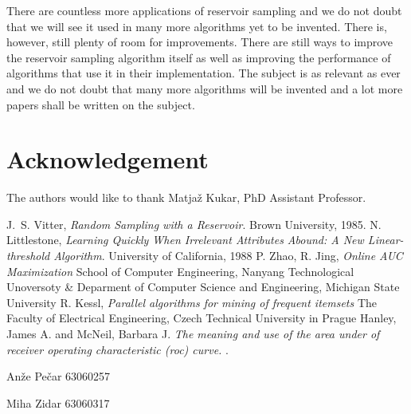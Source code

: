 \documentclass[journal]{IEEEtran/IEEEtran}
\begin{document}
There are countless more applications of reservoir sampling and we do not doubt that we will see it used in many more algorithms yet to be invented. There is, however, still plenty of room for improvements. There are still ways to improve the reservoir sampling algorithm itself as well as improving the performance of algorithms that use it in their implementation. The subject is as relevant as ever and we do not doubt that many more algorithms will be invented and a lot more papers shall be written on the subject. 
\appendices

\section*{Acknowledgement}
The authors would like to thank Matjaž Kukar, PhD Assistant Professor.


\begin{thebibliography}{1}
J.~S. Vitter, \emph{Random Sampling with a Reservoir}. \relax Brown University, 1985.
N. Littlestone, \emph{Learning Quickly When Irrelevant Attributes
Abound: A New Linear-threshold Algorithm}. \relax University of California, 1988
P. Zhao, R. Jing, \emph{Online AUC Maximization} \relax School of Computer Engineering, Nanyang Technological Unoversoty \& Deparment of Computer Science and Engineering, Michigan State University
R. Kessl, \emph{Parallel algorithms for mining of frequent itemsets} \relax The Faculty of Electrical Engineering, Czech Technical University in Prague
Hanley, James A. and McNeil, Barbara J. \emph{The meaning and
use of the area under of receiver operating characteristic
(roc) curve.} .

\end{thebibliography}

\newpage

\begin{IEEEbiography}{Anže Pečar}
63060257
\end{IEEEbiography}

\begin{IEEEbiography}{Miha Zidar}
63060317
\end{IEEEbiography}
\end{document}

